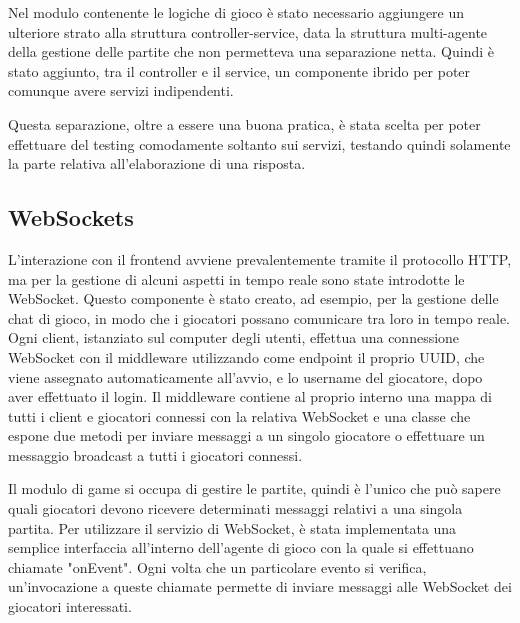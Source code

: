 Nel modulo contenente le logiche di gioco è stato necessario aggiungere un ulteriore strato alla struttura controller-service, data la struttura multi-agente della gestione delle partite che non permetteva una separazione netta. Quindi è stato aggiunto, tra il controller e il service, un componente ibrido per poter comunque avere servizi indipendenti.

Questa separazione, oltre a essere una buona pratica, è stata scelta per poter effettuare del testing comodamente soltanto sui servizi, testando quindi solamente la parte relativa all'elaborazione di una risposta.

\subsection{WebSockets}

L'interazione con il frontend avviene prevalentemente tramite il protocollo HTTP, ma per la gestione di alcuni aspetti in tempo reale sono state introdotte le WebSocket.
Questo componente è stato creato, ad esempio, per la gestione delle chat di gioco, in modo che i giocatori possano comunicare tra loro in tempo reale. Ogni client, istanziato sul computer degli utenti, effettua una connessione WebSocket con il middleware utilizzando come endpoint il proprio UUID, che viene assegnato automaticamente all'avvio, e lo username del giocatore, dopo aver effettuato il login. Il middleware contiene al proprio interno una mappa di tutti i client e giocatori connessi con la relativa WebSocket e una classe che espone due metodi per inviare messaggi a un singolo giocatore o effettuare un messaggio broadcast a tutti i giocatori connessi.

Il modulo di game si occupa di gestire le partite, quindi è l'unico che può sapere quali giocatori devono ricevere determinati messaggi relativi a una singola partita. Per utilizzare il servizio di WebSocket, è stata implementata una semplice interfaccia all'interno dell'agente di gioco con la quale si effettuano chiamate "onEvent". Ogni volta che un particolare evento si verifica, un'invocazione a queste chiamate permette di inviare messaggi alle WebSocket dei giocatori interessati.

